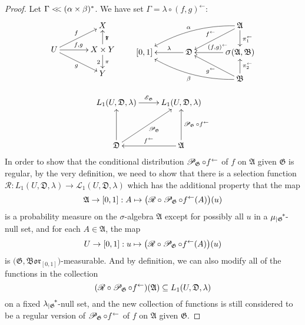 \documentclass[
twoside=true,
paper=letter,
fontsize=11pt,
pagesize=auto,
leqno,
openany,
headsepline,
overfullrule,
]{scrbook}
\theoremstyle{plain}
\theoremstyle{plain}
\theoremstyle{definition}
\theoremstyle{bfnoteitalic}
\theoremstyle{bfnoteroman}
\newcommand{\sigalg}[1]{\mathfrak{#1}}
\newcommand{\cali}[1]{\mathscr{#1}}
\newcommand{\condexpop}[1]{\mathop{\cali{E}\hspace{-1pt}}\nolimits_{#1}}
\newcommand{\condprobop}[1]{\mathop{\cali{P}\hspace{-1pt}}\nolimits_{#1}}
\newcommand{\borel}{\mathfrak{Bor}}
\newcommand{\sagb}{\mathop{\hbox{\large{$\sigma$}}}\nolimits}
\newcommand{\textsigma}{\hbox{\large{$\sigma$}}\kern-1pt}
\newcommand{\restrictedto}[1]{_{\lvert#1}\kern-1.5pt}
\newcommand{\preimage}[1]{#1^{\leftarrow}}
\newcommand{\sigmaalgebra}{\sigalg{A}}
\newcommand{\sigmaalgebraii}{\sigalg{B}}
\newcommand{\productsig}[2]{\sagb(#1,#2)}
\newcommand{\kernast}{\ast\kern-1pt}
\newcommand{\funcf}{f}
\newcommand{\funcg}{g}
\newcommand{\function}{f}
\newcommand{\measurespace}{X}
\newcommand{\measurespaceii}{Y}
\newcommand{\abscont}{\mathrel{< \kern-3.5pt <}}
\newcommand{\measure}{\mu}
\newcommand{\measlambda}{\lambda}
\newcommand{\seti}{A}
\newcommand{\regular}{\cali{R}}
\newcommand{\projectionone}{\pi_1}
\newcommand{\projectiontwo}{\pi_2}
\newcommand{\uspace}{U}%
\newcommand{\uspaceelt}{u}
\newcommand{\uspacesig}{\sigalg{D}}
\newcommand{\joint}{\Gamma}%
\newcommand{\marginalone}{\alpha}%
\newcommand{\marginaltwo}{\beta}%
\begin{document}
\begin{proof}
Let $\joint \abscont (\marginalone\times\marginaltwo)^*$.
We have set
$\joint = \measlambda\circ\preimage{({\funcf,\funcg})}$:
\[
\xymatrix@R=16pt@C=34pt{
 & \measurespace
 \\
 \uspace
 \ar[ur]^{\funcf}
 \ar[dr]_{\funcg}
 \ar[r]^{\funcf, \funcg} &
 \measurespace \times \measurespaceii  \ar[u]_\projectionone \ar[d]^\projectiontwo
 \\
 & \measurespaceii  \\
}
\qquad
\xymatrix@R=18pt@C=34pt{
 & & \sigmaalgebra
 \ar[dl]_{\preimage{\funcf}}
 \ar[d]^{\preimage{\projectionone}}
 \ar@/_10pt/[lld]_{\marginalone}
 \\
 [0,1] & \uspacesig \ar[l]_-{\measlambda} &
 \productsig{\sigmaalgebra}{\sigmaalgebraii}
 \ar[l]_{\hskip8pt \preimage{(\funcf,\funcg)}}
 \\
 & & \sigmaalgebraii
  \ar[u]_{\preimage{\projectiontwo}}
  \ar[ul]^{\preimage{\funcg}}
  \ar@/^10pt/[llu]^{\marginaltwo}
  \\
}
\]


\[%
\xymatrix@R=16pt@C=24pt{
L_1(\uspace, \uspacesig, \measlambda) \ar[r]^{\condexpop{\sigalg{G}}}
& L_1(\uspace, \uspacesig, \measlambda)
\\
&
\\
\uspacesig \ar[uu] \ar[uur]_{ \condprobop{\sigalg{G}} }
& \sigmaalgebra
\ar[uu]_{ \condprobop{\sigalg{G}} \circ \preimage{\function} }
\ar[l]_{\preimage{\funcf}}
\\
}
\]
In order to show that the conditional distribution
$\condprobop{\sigalg{G}}\circ \preimage{\funcf}$ of $\funcf$ on $\sigmaalgebra$ given $\sigalg{G}$ is regular, by the very definition, we need to show that there is a selection function
$\regular:
L_1(\uspace,\uspacesig,\measlambda)
\to
\cali{L}_1(\uspace,\uspacesig,\measlambda) $
which has the additional property that the map
\[
\sigmaalgebra\to [0,1]: \seti \mapsto
\bigl( \regular\circ\condprobop{\sigalg{G}} \circ\preimage{\function}
(\seti)\bigr)(\uspaceelt)
\]
is a probability measure on the \textsigma\hyp{}algebra $\sigmaalgebra$ except for possibly all
$\uspaceelt$ in a
${\measure\restrictedto{\sigalg{G}}}^\kernast$-null set,
and for each
$\seti\in\sigmaalgebra$, the map
\[
\uspace\to [0,1] : \uspaceelt\mapsto
\bigl( \regular\circ\condprobop{\sigalg{G}}\circ\preimage{\function}
(\seti)\bigr)(\uspaceelt)
\]
is $\bigl(\sigalg{G}, \borel_{[0,1]}\bigr)$\hyp{}measurable.
And by definition, we can also modify all of the functions in the collection
\[
(\regular\circ\condprobop{\sigalg{G}}\circ\preimage{\function})
(\sigmaalgebra)
\subseteq
L_1(\uspace,\uspacesig,\measlambda)
\]
on a fixed
${ \measlambda\restrictedto{\sigalg{G}} }^\kernast$\hyp{}null set,
and the new collection of functions is still considered to be a
regular version of
$\condprobop{\sigalg{G}}\circ\preimage{\function}$
of $\function$
on $\sigmaalgebra$ given $\sigalg{G}$.


\end{proof}
\end{document}
